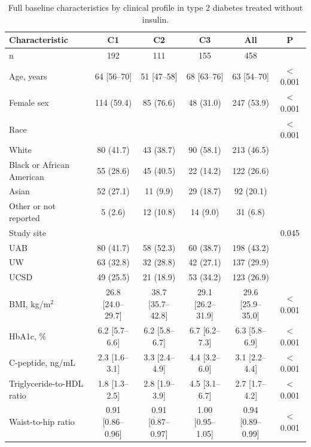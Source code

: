 \begin{table}[htbp]
\centering
\footnotesize
\caption{Full baseline characteristics by clinical profile in type 2 diabetes treated without insulin.}
\label{tab:baseline-full}
\begin{tabular}{lccccc}
\toprule
Characteristic & C1 & C2 & C3 & All & P \\
\midrule
n & 192 & 111 & 155 & 458 &  \\
Age, years & 64 [56--70] & 51 [47--58] & 68 [63--76] & 63 [54--70] & $<$0.001 \\
Female sex & 114 (59.4) & 85 (76.6) & 48 (31.0) & 247 (53.9) & $<$0.001 \\
Race &  &  &  &  & $<$0.001 \\
\hspace{1em}White & 80 (41.7) & 43 (38.7) & 90 (58.1) & 213 (46.5) &  \\
\hspace{1em}Black or African American & 55 (28.6) & 45 (40.5) & 22 (14.2) & 122 (26.6) &  \\
\hspace{1em}Asian & 52 (27.1) & 11 (9.9) & 29 (18.7) & 92 (20.1) &  \\
\hspace{1em}Other or not reported & 5 (2.6) & 12 (10.8) & 14 (9.0) & 31 (6.8) &  \\
Study site &  &  &  &  & 0.045 \\
\hspace{1em}UAB & 80 (41.7) & 58 (52.3) & 60 (38.7) & 198 (43.2) &  \\
\hspace{1em}UW & 63 (32.8) & 32 (28.8) & 42 (27.1) & 137 (29.9) &  \\
\hspace{1em}UCSD & 49 (25.5) & 21 (18.9) & 53 (34.2) & 123 (26.9) &  \\
BMI, kg/m$^2$ & 26.8 [24.0--29.7] & 38.7 [35.7--42.8] & 29.1 [26.2--31.9] & 29.6 [25.9--35.0] & $<$0.001 \\
HbA1c, \% & 6.2 [5.7--6.6] & 6.2 [5.8--6.7] & 6.7 [6.2--7.3] & 6.3 [5.8--6.9] & $<$0.001 \\
C-peptide, ng/mL & 2.3 [1.6--3.1] & 3.3 [2.4--4.9] & 4.4 [3.2--6.0] & 3.1 [2.2--4.4] & $<$0.001 \\
Triglyceride-to-HDL ratio & 1.8 [1.3--2.5] & 2.8 [1.9--3.9] & 4.5 [3.1--6.7] & 2.7 [1.7--4.2] & $<$0.001 \\
Waist-to-hip ratio & 0.91 [0.86--0.96] & 0.91 [0.87--0.97] & 1.00 [0.95--1.05] & 0.94 [0.89--0.99] & $<$0.001 \\

\end{tabular}
\end{table}
